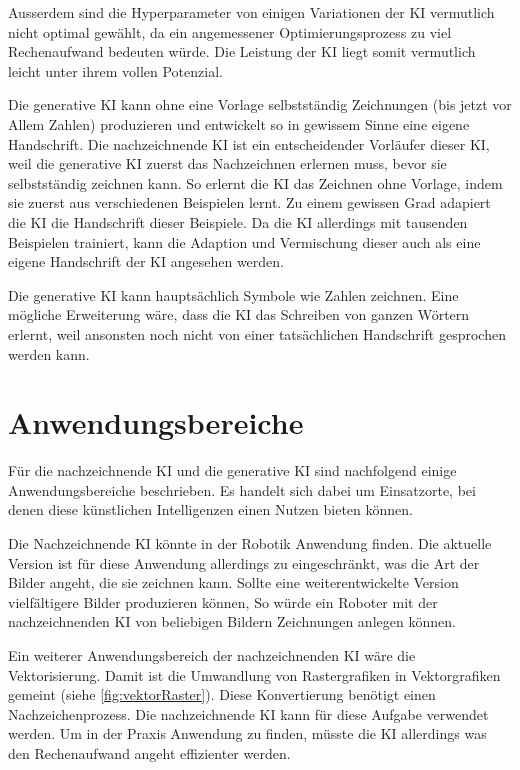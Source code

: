 Ausserdem sind die Hyperparameter von einigen Variationen der KI vermutlich
nicht optimal gewählt, da ein angemessener Optimierungsprozess zu viel
Rechenaufwand bedeuten würde. Die Leistung der KI liegt somit vermutlich leicht
unter ihrem vollen Potenzial.

Die generative KI kann ohne eine Vorlage selbstständig Zeichnungen (bis jetzt
vor Allem Zahlen) produzieren und entwickelt so in gewissem Sinne eine eigene
Handschrift. Die nachzeichnende KI ist ein entscheidender Vorläufer dieser KI,
weil die generative KI zuerst das Nachzeichnen erlernen muss, bevor sie
selbstständig zeichnen kann. So erlernt die KI das Zeichnen ohne Vorlage, indem
sie zuerst aus verschiedenen Beispielen lernt. Zu einem gewissen Grad adapiert
die KI die Handschrift dieser Beispiele. Da die KI allerdings mit tausenden
Beispielen trainiert, kann die Adaption und Vermischung dieser auch als eine
eigene Handschrift der KI angesehen werden.

Die generative KI kann hauptsächlich Symbole wie Zahlen zeichnen. Eine mögliche
Erweiterung wäre, dass die KI das Schreiben von ganzen Wörtern erlernt, weil
ansonsten noch nicht von einer tatsächlichen Handschrift gesprochen werden kann.


\section{Anwendungsbereiche}\label{chap:d_anwendung} Für die nachzeichnende KI
und die generative KI sind nachfolgend einige Anwendungsbereiche beschrieben. Es
handelt sich dabei um Einsatzorte, bei denen diese künstlichen Intelligenzen
einen Nutzen bieten können.

Die Nachzeichnende KI könnte in der Robotik Anwendung finden. Die aktuelle
Version ist für diese Anwendung allerdings zu eingeschränkt, was die Art der
Bilder angeht, die sie zeichnen kann. Sollte eine weiterentwickelte Version
vielfältigere Bilder produzieren können, So würde ein Roboter mit der
nachzeichnenden KI von beliebigen Bildern Zeichnungen anlegen können.

Ein weiterer Anwendungsbereich der nachzeichnenden KI wäre die Vektorisierung.
Damit ist die Umwandlung von Rastergrafiken in Vektorgrafiken gemeint (siehe
\autoref{fig:vektorRaster}). Diese Konvertierung benötigt einen
Nachzeichenprozess. Die nachzeichnende KI kann für diese Aufgabe verwendet
werden. Um in der Praxis Anwendung zu finden, müsste die KI allerdings was den
Rechenaufwand angeht effizienter werden.

